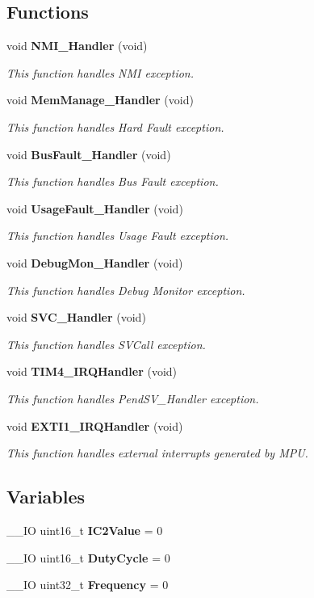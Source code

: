 \subsection*{Functions}
\begin{DoxyCompactItemize}
\item 
void \textbf{ N\+M\+I\+\_\+\+Handler} (void)
\begin{DoxyCompactList}\small\item\em This function handles N\+MI exception. \end{DoxyCompactList}\item 
void \textbf{ Mem\+Manage\+\_\+\+Handler} (void)
\begin{DoxyCompactList}\small\item\em This function handles Hard Fault exception. \end{DoxyCompactList}\item 
void \textbf{ Bus\+Fault\+\_\+\+Handler} (void)
\begin{DoxyCompactList}\small\item\em This function handles Bus Fault exception. \end{DoxyCompactList}\item 
void \textbf{ Usage\+Fault\+\_\+\+Handler} (void)
\begin{DoxyCompactList}\small\item\em This function handles Usage Fault exception. \end{DoxyCompactList}\item 
void \textbf{ Debug\+Mon\+\_\+\+Handler} (void)
\begin{DoxyCompactList}\small\item\em This function handles Debug Monitor exception. \end{DoxyCompactList}\item 
void \textbf{ S\+V\+C\+\_\+\+Handler} (void)
\begin{DoxyCompactList}\small\item\em This function handles S\+V\+Call exception. \end{DoxyCompactList}\item 
void \textbf{ T\+I\+M4\+\_\+\+I\+R\+Q\+Handler} (void)
\begin{DoxyCompactList}\small\item\em This function handles Pend\+S\+V\+\_\+\+Handler exception. \end{DoxyCompactList}\item 
void \textbf{ E\+X\+T\+I1\+\_\+\+I\+R\+Q\+Handler} (void)
\begin{DoxyCompactList}\small\item\em This function handles external interrupts generated by M\+PU. \end{DoxyCompactList}\end{DoxyCompactItemize}
\subsection*{Variables}
\begin{DoxyCompactItemize}
\item 
\+\_\+\+\_\+\+IO uint16\+\_\+t \textbf{ I\+C2\+Value} = 0
\item 
\+\_\+\+\_\+\+IO uint16\+\_\+t \textbf{ Duty\+Cycle} = 0
\item 
\+\_\+\+\_\+\+IO uint32\+\_\+t \textbf{ Frequency} = 0
\end{DoxyCompactItemize}
